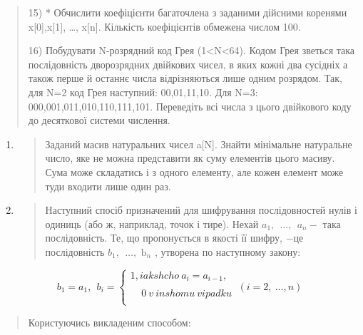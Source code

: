 \documentclass[]{article}
\begin{document}
\begin{quote}
15) * Обчислити коефіцієнти багаточлена з заданими дійсними коренями
x{[}0{]},x{[}1{]}, \ldots{}, x{[}n{]}. Кількість коефіцієнтів обмежена
числом 100.

16) Побудувати N-розрядний код Грея (1\textless{}N\textless{}64). Кодом
Грея зветься така послідовність дворозрядних двійкових чисел, в яких
кожні два сусідніх а також перше й останнє числа відрізняються лише
одним розрядом. Так, для N=2 код Грея наступний: 00,01,11,10. Для N=3:
000,001,011,010,110,111,101. Переведіть всі числа з цього двійкового
коду до десяткової системи числення.
\end{quote}

\begin{enumerate}
\def\labelenumi{\arabic{enumi})}
\setcounter{enumi}{16}
\item
  \begin{quote}
  Заданий масив натуральних чисел a{[}N{]}. Знайти мінімальне натуральне
  число, яке не можна представити як суму елементів цього масиву. Сума
  може складатись і з одного елементу, але кожен елемент може туди
  входити лише один раз.
  \end{quote}
\item
  \begin{quote}
  Наступний спосіб призначений для шифрування послідовностей нулів і
  одиниць (або ж, наприклад, точок і тире). Нехай
  \(a_{1},\ \ \ldots,\ \ a_{n} -\) така послідовність. Те, що
  пропонується в якості її шифру, \(-\)це послідовність
  \(b_{1},\ \ \ldots,\text{\ b}_{n}\) , утворена по наступному закону:
  \end{quote}
\end{enumerate}

\[b_{1} = a_{1},\ \ b_{i} = \left\{ \begin{matrix}
1,iakshcho\ a_{i} = a_{i - 1}, \\
 \\
\ \ \ \ \ 0\ v\ inshomu\ vipadku \\
\end{matrix} \right.\ \left( i = 2,\ ...,n \right)\]

\begin{quote}
Користуючись викладеним способом:
\end{quote}
\end{document}
